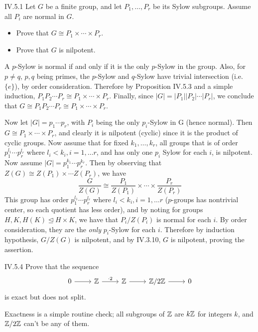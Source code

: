 \begin{problem}{IV.5.1}
Let $G$ be a finite group, and let $P_1, \dotsc, P_r$ be its Sylow subgroups. Assume all $P_i$ are normal in $G$.
\begin{itemize}
	\setlength\itemsep{0pt}
	\item Prove that $G \cong P_1 \times \cdots \times P_r$.
	\item Prove that $G$ is nilpotent.
\end{itemize}
\end{problem}
\begin{pf}
A $p$-Sylow is normal if and only if it is the only $p$-Sylow in the group. Also, for $p \neq q$, $p, q$ being primes, the $p$-Sylow and $q$-Sylow have trivial intersection (i.e. $\{e\}$), by order consideration. Therefore by Proposition IV.5.3 and a simple induction, $P_1P_2 \cdots P_r \cong P_1 \times \cdots \times P_r$. Finally, since $|G| = |P_1||P_2| \cdots |P_r|$, we conclude that $G \cong P_1P_2 \cdots P_r \cong P_1 \times \cdots \times P_r$. 

Now let $|G| = p_1\cdots p_r$, with $P_i$ being the only $p_i$-Sylow in G (hence normal). Then $G \cong P_1 \times \cdots \times P_r$, and clearly it is nilpotent (cyclic) since it is the product of cyclic groups. Now assume that for fixed $k_1,\dotsc, k_r$, all groups that is of order $p_1^{l_1}\cdots p_r^{l_r}$ where $l_i < k_i, i = 1,\dotsc r$, and has only one $p_i$ Sylow for each $i$, is nilpotent. Now assume $|G| = p_1^{k_1}\cdots p_r^{k_r}$. Then by observing that $Z(G) \cong Z(P_1) \times \cdots Z(P_r)$, we have 
\[
\frac{G}{Z(G)} \cong \frac{P_1}{Z(P_1)} \times \cdots \times \frac{P_r}{Z(P_r)}	
\]
This group has order $p_1^{l_1}\cdots p_r^{l_r}$ where $l_i < k_i, i = 1,\dotsc r$ ($p$-groups has nontrivial center, so each quotient has less order), and by noting for groups $H, K, H (K) \unlhd H \times K$, we have that $P_i/Z(P_i)$ is normal for each $i$. By order consideration, they are the \emph{only} $p_i$-Sylow for each $i$. Therefore by induction hypothesis, $G/Z(G)$ is nilpotent, and by IV.3.10, $G$ is nilpotent, proving the assertion.

\end{pf}

\begin{problem}{IV.5.4}
Prove that the sequence
\[
\begin{tikzcd}
0 \arrow[r] &\Z \arrow[r, "\cdot 2"] &\Z \arrow[r] &\Z/2\Z \arrow[r] &0
\end{tikzcd}
\]
is exact but does not split.
\end{problem}
\begin{pf}
Exactness is a simple routine check; all subgroups of $\mathbb{Z}$ are $k\mathbb{Z}$ for integers $k$, and $\mathbb{Z}/2\mathbb{Z}$ can't be any of them.
\end{pf}


